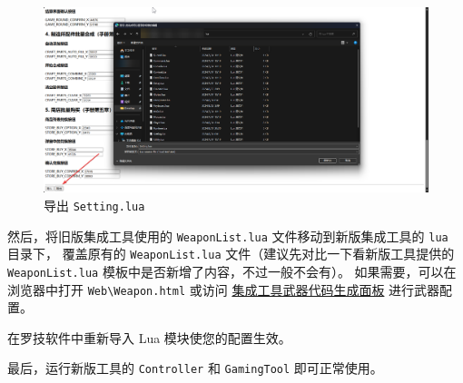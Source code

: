 \begin{figure}[H]
    \Centering
    \includegraphics[width=\textwidth]{docs/assets/update/override_setting}
    \caption{导出 \lstinline{Setting.lua}}
\end{figure}

然后，将旧版集成工具使用的 \lstinline{WeaponList.lua} 文件移动到新版集成工具的 \lstinline{lua} 目录下，
覆盖原有的 \lstinline{WeaponList.lua} 文件（建议先对比一下看新版工具提供的 \lstinline{WeaponList.lua} 模板中是否新增了内容，不过一般不会有）。
如果需要，可以在浏览器中打开 \lstinline{Web\Weapon.html} 或访问 \href{https://macrohard.fun/CSOL-Utilities/Weapon.html}{集成工具武器代码生成面板} 进行武器配置。

在罗技软件中重新导入 Lua 模块使您的配置生效。

最后，运行新版工具的 \lstinline{Controller} 和 \lstinline{GamingTool} 即可正常使用。
